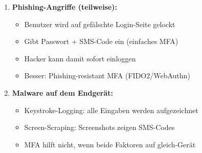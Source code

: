 \documentclass[12pt,a4paper]{article}
\begin{document}
\begin{tcolorbox}[colback=solutionbg, colframe=black!30]
\begin{enumerate}[1.]
    \item \textbf{Phishing-Angriffe (teilweise):}
    \begin{itemize}
        \item Benutzer wird auf gefälschte Login-Seite gelockt
        \item Gibt Passwort + SMS-Code ein (einfaches MFA)
        \item Hacker kann damit sofort einloggen
        \item Besser: Phishing-resistant MFA (FIDO2/WebAuthn)
    \end{itemize}
    
    \item \textbf{Malware auf dem Endgerät:}
    \begin{itemize}
        \item Keystroke-Logging: alle Eingaben werden aufgezeichnet
        \item Screen-Scraping: Screenshots zeigen SMS-Codes
        \item MFA hilft nicht, wenn beide Faktoren auf gleich-Gerät
    \end{itemize}
\end{enumerate}

\end{tcolorbox}
\end{document}
